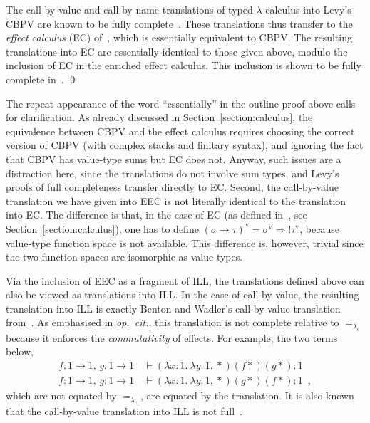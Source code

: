 \documentclass{LMCS}
\newcommand{\Cfun}{\Rightarrow}
\newcommand{\Cbang}[1]{{! #1}}
\newcommand{\In}[2]{#1 \colon  \! #2}
\newcommand{\rIn}[2]{#1 \colon  #2}
\newcommand{\LCequals}{=_{\lambda_c}}
\newcommand{\Lone}{1}
\newcommand{\Lfun}{\to}
\newcommand{\Lj}[3]{#1  \, \vdash  \rIn{#2}{#3}}
\newcommand{\Lstar}{*}
\newcommand{\Llam}[3]{\lambda \In{#1}{#2}.\: #3}
\newcommand{\Lappl}[2]{#1  #2}
\newcommand{\cbv}[1]{#1^{\mathrm{v}}}
\begin{document}
The call-by-value and call-by-name translations 
of typed $\lambda$-calculus into Levy's CBPV are
known to be fully complete~\cite[Appendix A]{Levy:book}. These translations 
thus transfer to the \emph{effect calculus} (EC) of~\cite{EMSb}, which is essentially
equivalent to CBPV. The resulting translations into EC are essentially
identical to those given above, modulo the inclusion of EC in the
enriched effect calculus. This inclusion is shown to be fully
complete in~\cite{EMS,EMSc}.
\qed

\noindent
The repeat appearance of the word ``essentially'' in the outline proof above calls for
clarification. As already discussed in Section~\ref{section:calculus},
the equivalence between CBPV and the effect calculus requires choosing
the  correct version of CBPV (with complex stacks and finitary syntax), and
ignoring the fact that CBPV has value-type sums but  EC does not. Anyway, such
issues are a distraction here, since the translations do not involve sum types,
and Levy's proofs of full completeness transfer directly to EC. Second,
the call-by-value translation we have given into EEC
is not literally identical to the translation into EC. The difference is that,
in the case of EC (as defined in~\cite{EMSb}, see Section~\ref{section:calculus}),
one has to define 
$\cbv{(\sigma \! \Lfun \!\tau)} = \cbv{\sigma} \! \Cfun \! {\Cbang{\cbv{\tau}}}$, because
value-type function space is not available. This difference is, however, trivial
since the two function spaces are isomorphic as value types.

Via the inclusion of EEC as a fragment of ILL, the translations defined above can also be viewed as
translations into ILL. In the case of call-by-value, the resulting translation into ILL is 
exactly Benton and Wadler's call-by-value translation from~\cite{BW:96}. As emphasised in
\emph{op.\ cit.}, this translation is not complete relative to $\LCequals$ because it enforces the \emph{commutativity}
of effects. For example, the two terms below,
\begin{align}
\label{Mone}
\Lj{\In{f}{\Lone \Lfun \Lone },\, \In{g}{\Lone \Lfun \Lone} & }{\Lappl{\Lappl{(\Llam{x}{\Lone}{\Llam{y}{\Lone}{\Lstar}})}{(\Lappl{f}{\Lstar})}}{(\Lappl{g}{\Lstar})}}{\Lone}
\\
\label{Mtwo}
\Lj{\In{f}{\Lone \Lfun \Lone },\, \In{g}{\Lone \Lfun \Lone} & }{\Lappl{\Lappl{(\Llam{x}{\Lone}{\Llam{y}{\Lone}{\Lstar}})}{(\Lappl{g}{\Lstar})}}{(\Lappl{f}{\Lstar})}}{\Lone} \enspace ,
\end{align}
which are not equated by $\LCequals$, are equated by the translation.
It is also known that the call-by-value translation into ILL is not full~\cite{Hasegawa:Flops:02}.
\end{document}
